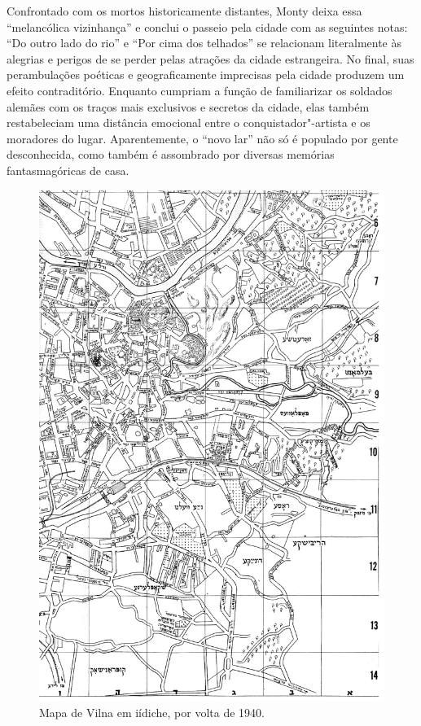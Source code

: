 %

Confrontado com os mortos historicamente distantes, Monty deixa essa
``melancólica vizinhança'' e conclui o passeio pela cidade com as
seguintes notas: ``Do outro lado do rio'' e ``Por cima dos telhados'' se
relacionam literalmente às alegrias e perigos de se perder pelas
atrações da cidade estrangeira. No final, suas perambulações poéticas e
geograficamente imprecisas pela cidade produzem um efeito contraditório.
Enquanto cumpriam a função de familiarizar os soldados alemães com os
traços mais exclusivos e secretos da cidade, elas também restabeleciam
uma distância emocional entre o conquistador"-artista e os moradores do
lugar. Aparentemente, o ``novo lar'' não só é populado por gente
desconhecida, como também é assombrado por diversas memórias
fantasmagóricas de casa.


\begin{figure}[!hp]
    \centering
    \includegraphics[width=\textwidth]{ilustra-09.png}
    \caption{Mapa de Vilna em iídiche, por volta de 1940.}
\end{figure}

